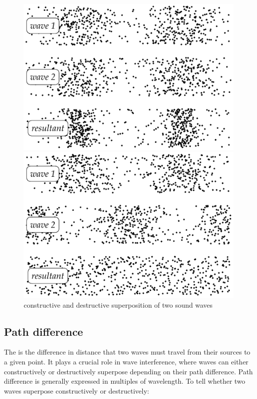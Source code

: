 \begin{figure}[htp]
	\centering
	\noindent\begin{minipage}{0.5\linewidth}
		\centering
		\includegraphics[width=.95\textwidth]{longitudinal+I.pdf}
	\end{minipage}\hfil
	\begin{minipage}{0.5\linewidth}
		\centering
		\includegraphics[width=.95\textwidth]{longitudinal-I.pdf}
	\end{minipage}
	\caption{constructive and destructive superposition of two sound waves} 
\end{figure}


\subsection{Path difference}

The  is the difference in distance that two waves must travel from their sources to a given point. It plays a crucial role in wave interference, where waves can either constructively or destructively superpose depending on their path difference. Path difference is generally expressed in multiples of wavelength. To tell whether two waves superpose constructively or destructively:

